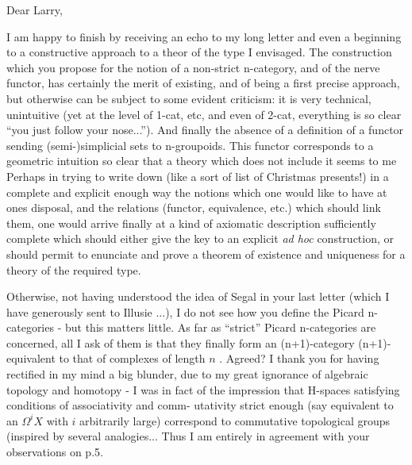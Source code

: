 

Dear Larry,

I am happy to finish by receiving an echo to my long letter and even a
beginning to a constructive approach to a theor of the type I envisaged.
The construction which you propose for the notion of a non-strict n-category,
and of the nerve functor, has certainly the merit of existing, and of being
a first precise approach, but otherwise can be subject to some evident
criticism: it is very technical, unintuitive (yet at the level of 1-cat, etc,
and even of 2-cat, everything is so clear\hand{-} ``you just follow your nose...'').
And finally the absence of a definition of a functor sending (semi-)simplicial
sets to n-groupoids. This functor corresponds to a geometric intuition so
clear that a theory which does not include it seems to me   Perhaps
in trying to write down (like a sort of list of Christmas presents!) in a
complete and explicit enough way the notions which one would like to have at
ones disposal, and the relations (functor, equivalence, etc.) which should link
them, one would arrive finally at a kind of axiomatic description sufficiently
complete which should either give the key to an explicit \textit{ad hoc} construction,
or should permit   to enunciate and prove a theorem of existence and
uniqueness  for a theory of the required type. \margin{\hand{$\times$}}

Otherwise, not having understood the idea of Segal in your last letter
(which I have generously sent to Illusie ...), I do not see how you define
the Picard n-categories - but this matters little. As far as ``strict'' Picard
n-categories are concerned, all I ask of them is that they finally form an
(n+1)-category (n+1)-equivalent to that of  complexes  of length $n$ .
Agreed? I thank you for having rectified in my mind a big blunder, due to
my great ignorance of algebraic topology and homotopy - I was in fact of the
impression that H-spaces satisfying conditions of associativity and comm-%
utativity strict enough (say equivalent to an $\Omega^{i}X$ with $i$ arbitrarily large)
correspond to commutative topological groups (inspired by several analogies...
Thus I am entirely in agreement with your observations on p.5.

